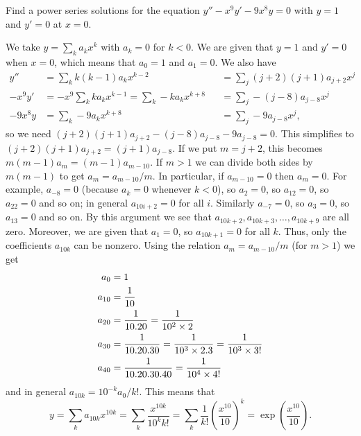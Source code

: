\documentclass[a4paper]{amsart}
\begin{document}
\begin{exercise}\label{ex-exp-ten}
 Find a power series solutions for the equation $y''-x^9y'-9x^8y=0$
 with $y=1$ and $y'=0$ at $x=0$.
\end{exercise}
\begin{solution}
 We take $y=\sum_ka_kx^k$ with $a_k=0$ for $k<0$.  We are given that
 $y=1$ and $y'=0$ when $x=0$, which means that $a_0=1$ and $a_1=0$.
 We also have 
 \begin{align*}
  y'' &= \sum_k k(k-1)a_kx^{k-2}
      &&= \sum_j (j+2)(j+1)a_{j+2} x^j \\
  -x^9y' &= -x^9\sum_k ka_k x^{k-1} = \sum_k -ka_kx^{k+8} 
         &&= \sum_j -(j-8)a_{j-8}x^j \\
  -9x^8y &= \sum_k -9a_kx^{k+8} &&= \sum_j -9a_{j-8}x^j,
 \end{align*}
 so we need $(j+2)(j+1)a_{j+2}-(j-8)a_{j-8}-9a_{j-8}=0$.  This
 simplifies to $(j+2)(j+1)a_{j+2}=(j+1)a_{j-8}$.  If we put $m=j+2$,
 this becomes $m(m-1)a_m=(m-1)a_{m-10}$.  If $m>1$ we can divide both
 sides by $m(m-1)$ to get $a_m=a_{m-10}/m$.  In particular, if
 $a_{m-10}=0$ then $a_m=0$.  For example, $a_{-8}=0$ (because $a_k=0$
 whenever $k<0$), so $a_2=0$, so $a_{12}=0$, so $a_{22}=0$ and so on;
 in general $a_{10i+2}=0$ for all $i$.  Similarly $a_{-7}=0$, so
 $a_3=0$, so $a_{13}=0$ and so on.  By this argument we see that
 $a_{10k+2},a_{10k+3},\dotsc,a_{10k+9}$ are all zero.  Moreover, we
 are given that $a_1=0$, so $a_{10k+1}=0$ for all $k$.  Thus, only the
 coefficients $a_{10k}$ can be nonzero.  Using the relation
 $a_m=a_{m-10}/m$ (for $m>1$) we get 
 \begin{align*}
  a_0    &= 1 \\
  a_{10} &= \frac{1}{10} \\
  a_{20} &= \frac{1}{10.20} = \frac{1}{10^2\times 2} \\
  a_{30} &= \frac{1}{10.20.30} = \frac{1}{10^3\times 2.3} = \frac{1}{10^3\times 3!} \\
  a_{40} &= \frac{1}{10.20.30.40} = \frac{1}{10^4\times 4!}
 \end{align*}
 and in general $a_{10k}=10^{-k}a_0/k!$.  This means that 
 \[ y = \sum_k a_{10k}x^{10k} 
      = \sum_k \frac{x^{10k}}{10^kk!}
      = \sum_k \frac{1}{k!}\left(\frac{x^{10}}{10}\right)^k
      = \exp\left(\frac{x^{10}}{10}\right).
 \]  
\end{solution}
\end{document}
